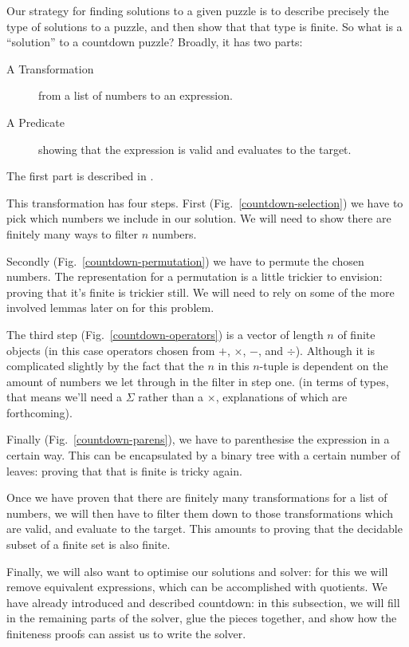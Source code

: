 
Our strategy for finding solutions to a given puzzle is to describe precisely
the type of solutions to a puzzle, and then show that that type is finite.
So what is a ``solution'' to a countdown puzzle?
Broadly, it has two parts:
\begin{description}
  \item[A Transformation] from a list of numbers to an expression.
  \item[A Predicate] showing that the expression is valid and evaluates to the
    target.
\end{description}
The first part is described in .


This transformation has four steps.
First (Fig.~\ref{countdown-selection}) we have to pick which numbers we include
in our solution.
We will need to show there are finitely many ways to filter \(n\) numbers.

Secondly (Fig.~\ref{countdown-permutation}) we have to permute the chosen
numbers.
The representation for a permutation is a little trickier to envision: proving
that it's finite is trickier still.
We will need to rely on some of the more involved lemmas later on for this
problem.

The third step (Fig.~\ref{countdown-operators}) is a vector of length \(n\) of finite objects (in this case operators
chosen from \(+\), \(\times\), \(-\), and \(\div\)).
Although it is complicated slightly by the fact that the \(n\) in this
\(n\)-tuple is dependent on the amount of numbers we let through in the filter
in step one.
(in terms of types, that means we'll need a \(\Sigma\) rather than a
\(\times\), explanations of which are forthcoming).

Finally (Fig.~\ref{countdown-parens}), we have to parenthesise the expression in
a certain way.
This can be encapsulated by a binary tree with a certain number of leaves:
proving that that is finite is tricky again.

Once we have proven that there are finitely many transformations for a list of
numbers, we will then have to filter them down to those transformations which
are valid, and evaluate to the target.
This amounts to proving that the decidable subset of a finite set is also
finite.

Finally, we will also want to optimise our solutions and solver: for this we
will remove equivalent expressions, which can be accomplished with quotients.
We have already introduced and described countdown: in this subsection, we will
fill in the remaining parts of the solver, glue the pieces together, and show
how the finiteness proofs can assist us to write the solver.
